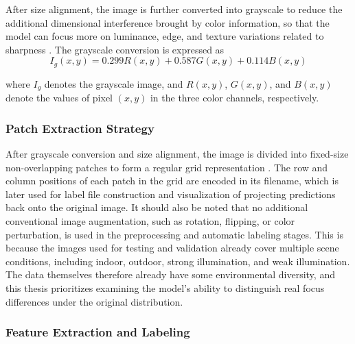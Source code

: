 \par

\par After size alignment, the image is further converted into grayscale to
reduce the additional dimensional interference brought by color information, so
that the model can focus more on luminance, edge, and texture variations related
to sharpness \cite{1284395}. The grayscale conversion is expressed as
\begin{equation}
    I_g(x,y)=0.299R(x,y)+0.587G(x,y)+0.114B(x,y)
    \label{eq:grayscale}
\end{equation}
\par where $I_g$ denotes the grayscale image, and $R(x,y)$, $G(x,y)$, and
$B(x,y)$ denote the values of pixel $(x,y)$ in the three color channels,
respectively.

\subsubsection{Patch Extraction Strategy}
\par After grayscale conversion and size alignment, the image is divided into
fixed-size non-overlapping patches to form a regular grid representation
\cite{Hou_2016_CVPR}. The row and column positions of each patch in the grid are
encoded in its filename, which is later used for label file construction and
visualization of projecting predictions back onto the original image. It should
also be noted that no additional conventional image augmentation, such as
rotation, flipping, or color perturbation, is used in the preprocessing and
automatic labeling stages. This is because the images used for testing and
validation already cover multiple scene conditions, including indoor, outdoor,
strong illumination, and weak illumination. The data themselves therefore
already have some environmental diversity, and this thesis prioritizes examining
the model's ability to distinguish real focus differences under the original
distribution.

\subsubsection{Feature Extraction and Labeling}
